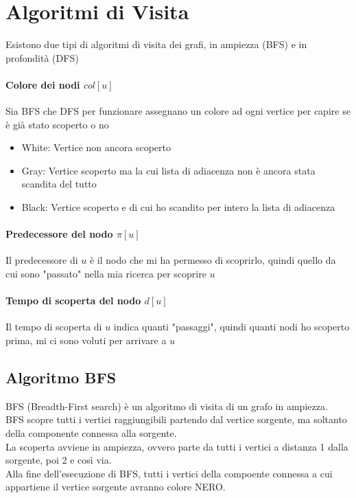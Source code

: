 \documentclass[12pt, a4paper, openany]{book}
\begin{document}
\section{Algoritmi di Visita}
Esistono due tipi di algoritmi di visita dei grafi, in ampiezza (BFS) e in profondità (DFS)

\paragraph{Colore dei nodi $col[u]$}
Sia BFS che DFS per funzionare assegnano un colore ad ogni vertice per capire se è già stato scoperto o no
\begin{itemize}
    \item White: Vertice non ancora scoperto
    \item Gray: Vertice scoperto ma la cui lista di adiacenza non è ancora stata scandita del tutto
    \item Black: Vertice scoperto e di cui ho scandito per intero la lista di adiacenza
\end{itemize}
\paragraph{Predecessore del nodo $\pi[u]$}
Il predecessore di $u$ è il nodo che mi ha permesso di scoprirlo, quindi quello da cui sono "passato" nella mia ricerca per scoprire $u$
\paragraph{Tempo di scoperta del nodo $d[u]$}
Il tempo di scoperta di $u$ indica quanti "passaggi", quindi quanti nodi ho scoperto prima, mi ci sono voluti per arrivare a $u$

\subsection{Algoritmo BFS}
BFS (Breadth-First search) è un algoritmo di visita di un grafo in ampiezza.
\\BFS scopre tutti i vertici raggiungibili partendo dal vertice sorgente, ma soltanto della componente connessa alla sorgente.
\\La scoperta avviene in ampiezza, ovvero parte da tutti i vertici a distanza 1 dalla sorgente, poi 2 e così via.
\\Alla fine dell'esecuzione di BFS, tutti i vertici della compoente connessa a cui appartiene il vertice sorgente avranno colore NERO.
\end{document}
